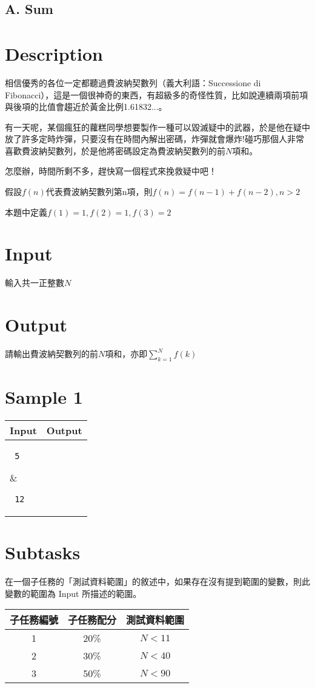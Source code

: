 \documentclass[11pt,a4paper]{article}
\begin{document}
\begin{center}
\section*{A. Sum}
\end{center}

\section*{Description}

相信優秀的各位一定都聽過費波納契數列（義大利語：Successione di Fibonacci），這是一個很神奇的東西，有超級多的奇怪性質，比如說連續兩項前項與後項的比值會趨近於黃金比例1.61832...。

有一天呢，某個瘋狂的蘿糕同學想要製作一種可以毀滅疑中的武器，於是他在疑中放了許多定時炸彈，只要沒有在時間內解出密碼，炸彈就會爆炸!碰巧那個人非常喜歡費波納契數列，於是他將密碼設定為費波納契數列的前$N$項和。

怎麼辦，時間所剩不多，趕快寫一個程式來挽救疑中吧！

假設$f(n)$代表費波納契數列第n項，則$f(n)=f(n-1)+f(n-2),n>2$

本題中定義$f(1)=1,f(2)=1,f(3)=2$

\section*{Input}

輸入共一正整數$N$


\section*{Output}

請輸出費波納契數列的前$N$項和，亦即$\displaystyle\sum^N_{k=1}f(k)$

\section*{Sample 1}
\begin{longtable}[!h]{|p{}|p{}|}
\hline
\textbf {Input}	& \textbf {Output} \\
\hline
\parbox[t]{0.5\textwidth} %
{ \tt
5
} &
\parbox[t]{0.5\textwidth}
{ \tt
12

} \\
\hline
\end{longtable}


\section*{Subtasks}

在一個子任務的「測試資料範圍」的敘述中，如果存在沒有提到範圍的變數，則此變數的範圍為 Input 所描述的範圍。

\begin{center}
 \begin{tabular}{||c c c||} 
 \hline
 子任務編號 & 子任務配分 & 測試資料範圍 \\  
 \hline
 \hline
 1 & 20\% & $N<11$ \\ 
 \hline
 2 & 30\% & $N<40$\\
 \hline 
 3 & 50\% & $N<90$ \\
 \hline

\end{tabular}
\end{center}
\end{document}
